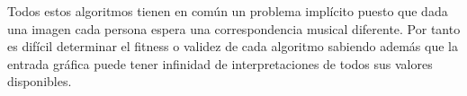 Todos estos algoritmos tienen en común un problema implícito puesto que dada una imagen cada persona espera una correspondencia musical diferente. Por tanto es difícil determinar el fitness o validez de cada algoritmo sabiendo además que la entrada gráfica puede tener infinidad de interpretaciones de todos sus valores disponibles.

